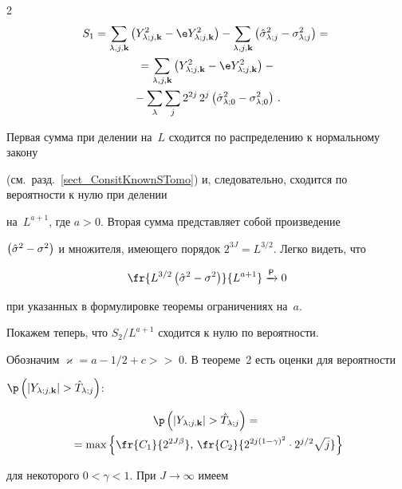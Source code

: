 \begin{multicols}{2}
\begin{multline*}
S_1 = \sumljk\left(\Yljk^2-\e\Yljk^2\right) - \sumljk \left(\hslj-\slj\right) = {}\\


{}= \sumljk\left(\Yljk^2-\e\Yljk^2\right) - {}\\


{}-\sum\limits_\lambda \sum_j 2^{2j}\,2^j \left(\hslz-\solz^2\right)\,.




\end{multline*}


Первая сумма при делении на~$L$ сходится по распределению к нормальному закону 


(см.\ разд.~\ref{sect_ConsitKnownSTomo}) и, следовательно, сходится по вероятности к нулю при делении 


на~$L^{a+1}$, где $a>0$. Вторая сумма пред\-став\-ля\-ет собой произведение 


$\left(\hat\sigma^2-\sigma^2\right)$ и множителя, имеющего порядок $2^{3J}=L^{3/2}$. Легко видеть, что


\begin{equation*}


\fr{L^{3/2}\left(\hsig-\sigma^2\right)}{L^{a+1}} \xrightarrow{\textsf{P}} 0


\end{equation*}


при указанных в формулировке теоремы ограничениях на~$a$.





Покажем теперь, что $S_2/L^{a+1}$ сходится к нулю по вероятности. 


Обозначим $\varkappa = a-1/2+c>$\linebreak $>\;0$. В теореме~2 есть оценки для вероятности 


$\p\left( |\Yljk| > \hTlj \right)$:


\begin{multline}


\p\left( |\Yljk| > \hTlj \right) = {}\\


{}=\max\left\{ \fr{C_1}{2^{2J\beta}},\,\fr{C_2}{2^{2j(1-\gamma)^2}\cdot 2^{j/2}\sqrt{j}} \right\} 


\label{eq_ProbYghTOrdersTomo}


\end{multline}


для некоторого $0<\gamma<1$. При $J\rightarrow\infty$ имеем



\end{multicols}
